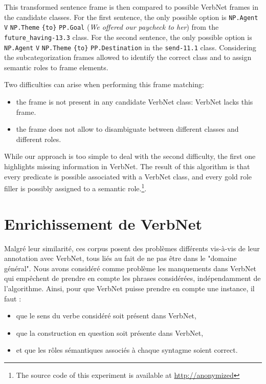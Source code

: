 This transformed sentence frame is then compared to possible VerbNet frames in
the candidate classes. For the first sentence, the only possible option is
\texttt{NP.Agent} \texttt{V} \texttt{NP.Theme} \texttt{\{to\}} \texttt{PP.Goal}
(\textit{We offered our paycheck to her}) from the \texttt{future\_having-13.3}
class. For the second sentence, the only possible option is \texttt{NP.Agent}
\texttt{V} \texttt{NP.Theme} \texttt{\{to\}} \texttt{PP.Destination} in the
\texttt{send-11.1} class. Considering the subcategorization frames allowed to
identify the correct class and to assign semantic roles to frame elements.

Two difficulties can arise when performing this frame matching:
\begin{itemize}
    \item the frame is not present in any candidate VerbNet class: VerbNet lacks this frame.
    \item the frame does not allow to disambiguate between different classes and different roles.
\end{itemize}

While our approach is too simple to deal with the second difficulty, the first
one highlights missing information in VerbNet. The result of this algorithm is
that every predicate is possible associated with a VerbNet class, and every
gold role filler is possibly assigned to a semantic role.\footnote{The source
code of this experiment is available at \url{http://anonymized}}.

\section{Enrichissement de VerbNet}

Malgré leur similarité, ces corpus posent des problèmes différents vis-à-vis de
leur annotation avec VerbNet, tous liés au fait de ne pas être dans le "domaine
général". Nous avons considéré comme problème les manquements dans VerbNet qui
empêchent de prendre en compte les phrases considérées, indépendamment de
l'algorithme. Ainsi, pour que VerbNet puisse prendre en compte une instance, il
faut :

\begin{itemize}
    \item que le sens du verbe considéré soit présent dans VerbNet,
    \item que la construction en question soit présente dans VerbNet,
    \item et que les rôles sémantiques associés à chaque syntagme soient correct.
\end{itemize}

